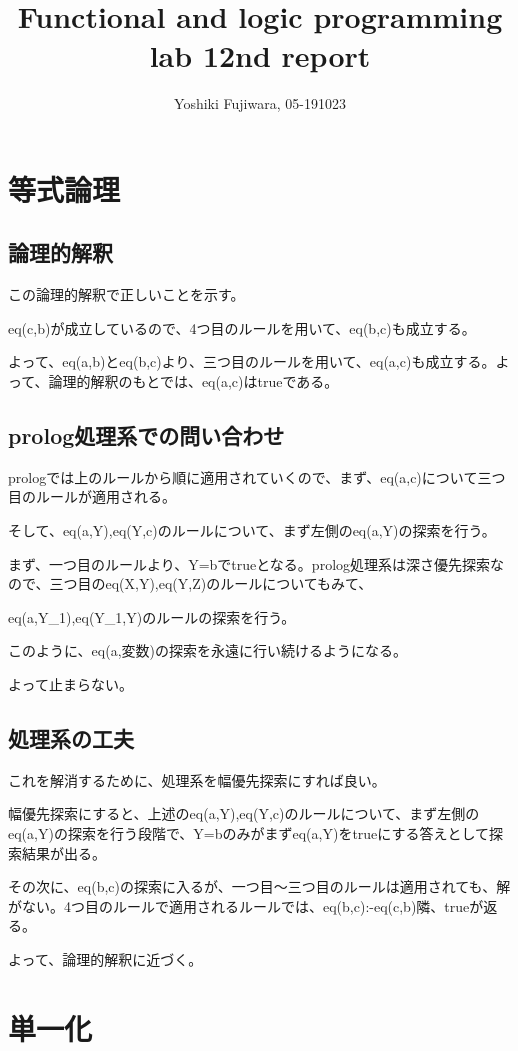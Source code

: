 \documentclass[uplatex,12pt]{jsarticle}
\title {Functional and logic programming lab 12nd report}
\date{}
\begin{document}
\author{Yoshiki Fujiwara, 05-191023}
\maketitle

\section{等式論理}
\subsection{論理的解釈}
この論理的解釈で正しいことを示す。

eq(c,b)が成立しているので、4つ目のルールを用いて、eq(b,c)も成立する。

よって、eq(a,b)とeq(b,c)より、三つ目のルールを用いて、eq(a,c)も成立する。よって、論理的解釈のもとでは、eq(a,c)はtrueである。

\subsection{prolog処理系での問い合わせ}
prologでは上のルールから順に適用されていくので、まず、eq(a,c)について三つ目のルールが適用される。

そして、eq(a,Y),eq(Y,c)のルールについて、まず左側のeq(a,Y)の探索を行う。

まず、一つ目のルールより、Y=bでtrueとなる。prolog処理系は深さ優先探索なので、三つ目のeq(X,Y),eq(Y,Z)のルールについてもみて、

eq(a,Y_1),eq(Y_1,Y)のルールの探索を行う。

このように、eq(a,変数)の探索を永遠に行い続けるようになる。

よって止まらない。

\subsection{処理系の工夫}
これを解消するために、処理系を幅優先探索にすれば良い。

幅優先探索にすると、上述のeq(a,Y),eq(Y,c)のルールについて、まず左側のeq(a,Y)の探索を行う段階で、Y=bのみがまずeq(a,Y)をtrueにする答えとして探索結果が出る。

その次に、eq(b,c)の探索に入るが、一つ目〜三つ目のルールは適用されても、解がない。4つ目のルールで適用されるルールでは、eq(b,c):-eq(c,b)隣、trueが返る。

よって、論理的解釈に近づく。


\section{単一化}
\end{document}
